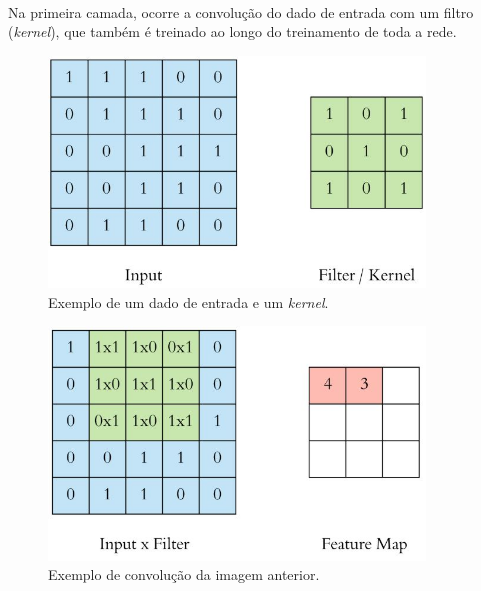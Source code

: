 \documentclass[grad,numbers]{coppe}
\begin{document}
		  \paragraph{}Na primeira camada, ocorre a convolução do dado de entrada com um filtro (\textit{kernel}), que também é treinado ao longo do treinamento de toda a rede.
		  \begin{figure}[h]
		  	\centering
		  	\includegraphics[width=10cm]{kernel.jpg}
		  	\caption{Exemplo de um dado de entrada e um \textit{kernel}\cite{kernel-example}.}
		  	\label{fig:kernel-fig}
		  \end{figure}
			\newpage
	  	\begin{figure}[h]
	  		\centering
	  		\includegraphics[width=10cm]{kernel2.jpg}
	  		\caption{Exemplo de convolução da imagem anterior\cite{kernel-example}.}
	  		\label{fig:kernel2-fig}
	  	\end{figure}
\end{document}
